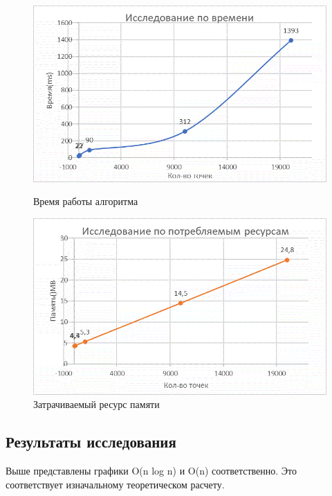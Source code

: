 \begin{figure}[H]
\centering
\includegraphics[scale=0.9]{time}
\caption{\label{tab:widgets}Время работы алгоритма}
\bigskip
\bigskip
\bigskip
\includegraphics[scale=0.9]{resource}
\caption{\label{tab:widgets}Затрачиваемый ресурс памяти}

\end{figure}
\subsection{Результаты исследования}
Выше представлены графики O(n log n) и O(n) соответственно. Это соответствует изначальному теоретическом расчету.


\clearpage
